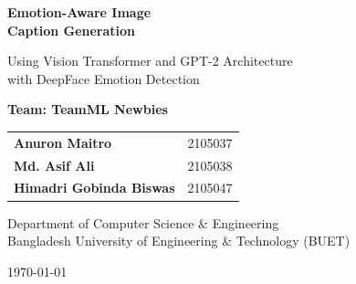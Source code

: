 \documentclass[12pt]{article}
\begin{document}

\begin{titlepage}
\centering
\vspace*{2cm}

{\Huge\bfseries Emotion-Aware Image\\[0.3cm] Caption Generation\par}
\vspace{1.5cm}

{\Large Using Vision Transformer and GPT-2 Architecture\\[0.2cm]
with DeepFace Emotion Detection\par}
\vspace{2cm}

{\large\textbf{Team: TeamML Newbies}\par}
\vspace{1cm}

{\large
\begin{tabular}{ll}
\textbf{Anuron Maitro} & 2105037 \\[0.3cm]
\textbf{Md. Asif Ali} & 2105038 \\[0.3cm]
\textbf{Himadri Gobinda Biswas} & 2105047 \\
\end{tabular}
\par}

\vspace{2cm}
{\large Department of Computer Science \& Engineering\\[0.2cm]
Bangladesh University of Engineering \& Technology (BUET)\par}

\vfill
{\large \today\par}
\end{titlepage}

\begin{abstract}
This report presents the development and deployment of an Emotion-Aware Image Caption Generation system that extends traditional image captioning by incorporating emotional context detected from human faces. Our system combines a Vision Transformer (ViT) encoder with a GPT-2 decoder for base caption generation, achieving competitive BLEU and METEOR scores on the Flickr30k dataset. We integrate DeepFace for seven-category emotion detection and employ NLTK-based grammatical insertion to create emotionally enhanced captions. The system is deployed as a production-ready web application using FastAPI backend on HuggingFace Spaces and React frontend on Vercel, demonstrating real-time emotion-aware captioning capabilities. Our implementation achieves a BLEU-1 score of 0.5947 and METEOR score of 0.2538, comparable to the reference paper's results, while successfully adding emotional depth to generated descriptions.
\end{abstract}
\end{document}
